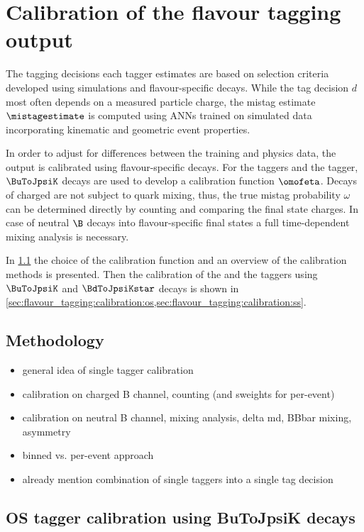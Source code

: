 \section{Calibration of the flavour tagging output}
\label{sec:flavour_tagging:calibration}

The tagging decisions each tagger estimates are based on selection criteria
developed using simulations and flavour-specific decays. While the tag decision
$d$ most often depends on a measured particle charge, the mistag estimate
$\mistagestimate$ is computed using \acp{ANN} trained on simulated data
incorporating kinematic and geometric event properties.

In order to adjust for differences between the training and physics data, the
\ANN output is calibrated using flavour-specific decays. For the \OS taggers and
the \SSpi tagger, $\BuToJpsiK$ decays are used to develop a calibration function
$\omofeta$. Decays of charged \Bmesons are not subject to quark mixing, thus,
the true mistag probability $\omega$ can be determined directly by counting and
comparing the final state charges. In case of neutral $\B$ decays into
flavour-specific final states a full time-dependent mixing analysis is
necessary.

In \cref{sec:flavour_tagging:calibration:method} the choice of the calibration
function and an overview of the calibration methods is presented. Then the
calibration of the \OS and the \SSpi taggers using $\BuToJpsiK$ and
$\BdToJpsiKstar$ decays is shown in
\cref{sec:flavour_tagging:calibration:os,sec:flavour_tagging:calibration:ss}.

\subsection{Methodology}
\label{sec:flavour_tagging:calibration:method}
\begin{itemize}
  \item general idea of single tagger calibration
  \item calibration on charged B channel, counting (and sweights for per-event)
  \item calibration on neutral B channel, mixing analysis, delta md, BBbar mixing, asymmetry
  \item binned vs. per-event approach
  \item already mention combination of single taggers into a single tag decision
\end{itemize}

\subsection{\ac{OS} tagger calibration using BuToJpsiK decays}
\label{sec:flavour_tagging:calibration:os}

